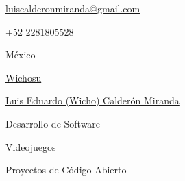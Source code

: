 \documentclass[11pt]{spidercv}
\begin{document}
    \begin{TopBar}{\ColorTextSide}

        \begin{DoubleColumns}
            \begin{ItemList}{\ColorHighlight}
                \item [\Large\faAt] \href{mailto:email@example.com}{luiscalderonmiranda@gmail.com}
                \item [\Large\faMobile] +52 2281805528
                \item [\Large\faMapMarker] México
            \end{ItemList}
            \nextcolumn
            \begin{ItemList}{\ColorHighlight}
                \item [\Large\faGithub] \href{https://github.com/Wichosu}{Wichosu}
                \item [\Large\faLinkedinSquare] \href{https://www.linkedin.com/in/luis-eduardo-calderón-miranda-2324b2204/}{Luis Eduardo (Wicho) Calderón Miranda}
            \end{ItemList}
        \end{DoubleColumns}

        \begin{TripleColumns}
            \begin{ItemList}{\ColorHighlight}
                \item [] Desarrollo de Software
            \end{ItemList}
            \nextcolumn
            \begin{ItemList}{\ColorHighlight}
                \item [] Videojuegos
            \end{ItemList}
            \nextcolumn
	    \begin{ItemList}{\ColorHighlight}
                \item [] Proyectos de Código Abierto
	    \end{ItemList}
        \end{TripleColumns}
    \end{TopBar}
\end{document}
